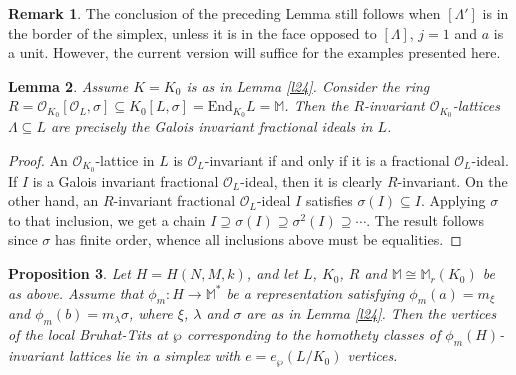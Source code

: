 \documentclass{article}
\newtheorem{prop}{Proposition}[section]
\newtheorem{lem}[prop]{Lemma}
\theoremstyle{definition}
\newtheorem{rem}[prop]{Remark}
\begin{document}
\begin{rem}
The conclusion of the preceding Lemma still follows when $[\Lambda']$
is in the border of the simplex, unless it is in the face opposed to
$[\Lambda]$, $j=1$ and $a$ is a unit. However, the
current version will suffice for the examples presented here.
\end{rem}

\begin{lem}\label{l22}
    Assume $K=K_0$ is as in Lemma \ref{l24}.
    Consider the ring $R=
    \mathcal{O}_{K_0}[\mathcal{O}_L,\sigma]\subseteq 
    K_0[L,\sigma]=\mathrm{End}_{K_0}L=\mathbb{M}$.
    Then the $R$-invariant $\mathcal{O}_{K_0}$-lattices
    $\Lambda\subseteq L$ are precisely the Galois invariant
    fractional ideals in $L$.
\end{lem}

\begin{proof}
    An $\mathcal{O}_{K_0}$-lattice in $L$ is 
    $\mathcal{O}_L$-invariant
    if and only if it is a fractional 
    $\mathcal{O}_L$-ideal. If $I$ is a 
    Galois invariant
    fractional $\mathcal{O}_L$-ideal, 
    then it is clearly $R$-invariant.
    On the other hand, an $R$-invariant
     fractional $\mathcal{O}_L$-ideal $I$
     satisfies $\sigma(I)\subseteq I$.
     Applying $\sigma$ to that 
     inclusion, we get a chain
     $I\supseteq \sigma(I)\supseteq
     \sigma^2(I)\supseteq\cdots$.
     The result follows since $\sigma$
     has finite order, whence all inclusions above must be equalities.
\end{proof}

\begin{prop}\label{p34}
    Let $H=H(N,M,k)$, and let $L$, $K_0$, $R$ and $\mathbb{M}\cong\mathbb{M}_r(K_0)$
    be as above. Assume that $\phi_m:H\rightarrow\mathbb{M}^*$ be a representation
    satisfying $\phi_m(a)=m_\xi$ and $\phi_m(b)=m_\lambda\sigma$, where $\xi$, $\lambda$
    and $\sigma$ are as in Lemma \ref{l24}. Then the vertices of 
    the local Bruhat-Tits at $\wp$ corresponding to the homothety classes 
    of $\phi_m(H)$-invariant lattices lie in a simplex with $e=e_\wp(L/K_0)$ vertices.
\end{prop}
\end{document}
